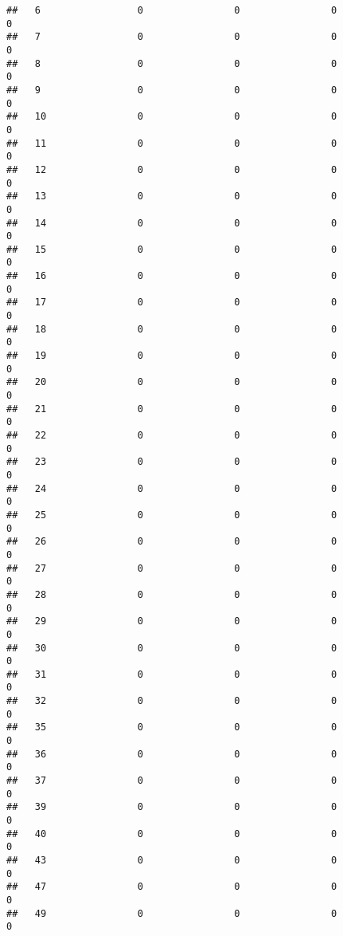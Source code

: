 \documentclass[]{article}
\begin{document}
\begin{verbatim}
##   6                 0                0                0                0
##   7                 0                0                0                0
##   8                 0                0                0                0
##   9                 0                0                0                0
##   10                0                0                0                0
##   11                0                0                0                0
##   12                0                0                0                0
##   13                0                0                0                0
##   14                0                0                0                0
##   15                0                0                0                0
##   16                0                0                0                0
##   17                0                0                0                0
##   18                0                0                0                0
##   19                0                0                0                0
##   20                0                0                0                0
##   21                0                0                0                0
##   22                0                0                0                0
##   23                0                0                0                0
##   24                0                0                0                0
##   25                0                0                0                0
##   26                0                0                0                0
##   27                0                0                0                0
##   28                0                0                0                0
##   29                0                0                0                0
##   30                0                0                0                0
##   31                0                0                0                0
##   32                0                0                0                0
##   35                0                0                0                0
##   36                0                0                0                0
##   37                0                0                0                0
##   39                0                0                0                0
##   40                0                0                0                0
##   43                0                0                0                0
##   47                0                0                0                0
##   49                0                0                0                0

\end{verbatim}
\end{document}
